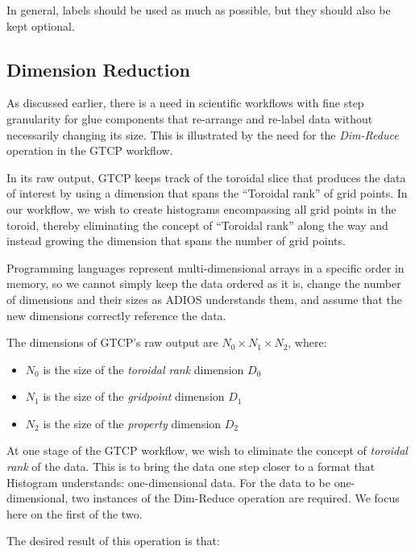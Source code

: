 In general, labels should be used as much as possible, but they
should also be kept optional.

\subsection{Dimension Reduction}
\label{subsec:dimreduce}
As discussed earlier, there is a need in
scientific workflows with fine
step granularity for glue components
that re-arrange and re-label data
without necessarily changing its size.
This is illustrated by the need for the {\em Dim-Reduce}
operation in the GTCP workflow.

In its raw output, GTCP keeps track of the
toroidal slice that produces the data of interest by using a
dimension that spans the ``Toroidal rank'' of grid points.
In our workflow, we
wish to create histograms encompassing all grid
points in the toroid, thereby
eliminating the concept of ``Toroidal rank''
along the way
and instead growing the dimension
that spans the number of grid points.

Programming languages represent multi-dimensional
arrays in a specific order in
memory, so we cannot simply keep the data
ordered as it is, change the number
of dimensions and their sizes as ADIOS understands them, 
and assume that the new dimensions correctly
reference the data.

The dimensions of GTCP's raw output are 
$N_0{\times}N_1{\times}N_2$, where:

\begin{itemize}

\item $N_0$ is the size of the {\em toroidal rank} dimension $D_0$

\item $N_1$ is the size of the {\em gridpoint} dimension $D_1$

\item $N_2$ is the size of the {\em property} dimension $D_2$

\end{itemize}

At one stage of the GTCP workflow, we wish
to eliminate the concept of
{\em toroidal rank} of the data. This is to bring the data one step
closer to a format that Histogram understands:
one-dimensional data.
For the data to be one-dimensional, two instances of the
Dim-Reduce operation are required.
We focus here on the first of the two.

The desired result of this operation is that:

